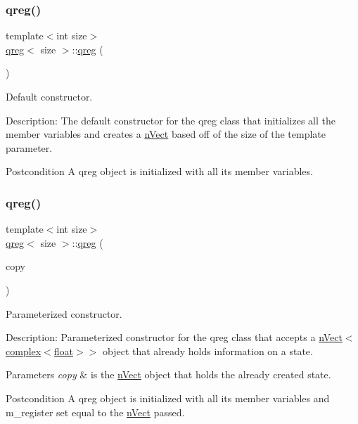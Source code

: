 \subsubsection{\texorpdfstring{qreg()}{qreg()}\hspace{0.1cm}{\footnotesize\ttfamily [1/3]}}
{\footnotesize\ttfamily template$<$int size$>$ \\
\hyperlink{classqreg}{qreg}$<$ size $>$\+::\hyperlink{classqreg}{qreg} (\begin{DoxyParamCaption}{ }\end{DoxyParamCaption})}



Default constructor. 

Description\+: The default constructor for the qreg class that initializes all the member variables and creates a \hyperlink{classnVect}{n\+Vect} based off of the size of the template parameter. \begin{DoxyPostcond}{Postcondition}
A qreg object is initialized with all its member variables. 
\end{DoxyPostcond}
\mbox{\label{classqreg_ae08c9f05247bf65c36bd8301dbcae423}} 
\subsubsection{\texorpdfstring{qreg()}{qreg()}\hspace{0.1cm}{\footnotesize\ttfamily [2/3]}}
{\footnotesize\ttfamily template$<$int size$>$ \\
\hyperlink{classqreg}{qreg}$<$ size $>$\+::\hyperlink{classqreg}{qreg} (\begin{DoxyParamCaption}\item[{\hyperlink{classnVect}{n\+Vect}$<$ \hyperlink{classcomplex}{complex}$<$ float $>$$>$ \&}]{copy }\end{DoxyParamCaption})}



Parameterized constructor. 

Description\+: Parameterized constructor for the qreg class that accepts a \hyperlink{classnVect}{n\+Vect}$<$\hyperlink{classcomplex}{complex$<$float$>$}$>$ object that already holds information on a state. 
\begin{DoxyParams}{Parameters}
{\em copy} & is the \hyperlink{classnVect}{n\+Vect} object that holds the already created state. \\
\hline
\end{DoxyParams}
\begin{DoxyPostcond}{Postcondition}
A qreg object is initialized with all its member variables and m\+\_\+register set equal to the \hyperlink{classnVect}{n\+Vect} passed. 
\end{DoxyPostcond}

